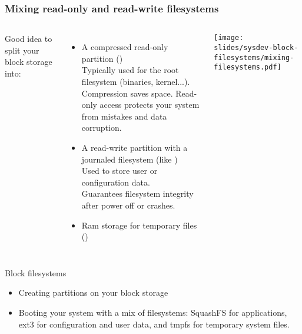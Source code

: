 \begin{frame}
  \frametitle{Mixing read-only and read-write filesystems}
  \begin{columns}
    Good idea to split your block storage into:
    \begin{itemize}
    \item A compressed read-only partition ()\\
      Typically used for the root filesystem (binaries, kernel...).\\
      Compression saves space. Read-only access protects your system
      from mistakes and data corruption.
    \item A read-write partition with a journaled filesystem (like )\\
      Used to store user or configuration data.\\
      Guarantees filesystem integrity after power off or crashes.
    \item Ram storage for temporary files ()
    \end{itemize}
    \texttt{[image: slides/sysdev-block-filesystems/mixing-filesystems.pdf]}
  \end{columns}
\end{frame}

\setuplabframe
{Block filesystems}
{
  \begin{itemize}
  \item Creating partitions on your block storage
  \item Booting your system with a mix of filesystems: SquashFS for
    applications, ext3 for configuration and user data, and tmpfs for
    temporary system files.
  \end{itemize}
}
